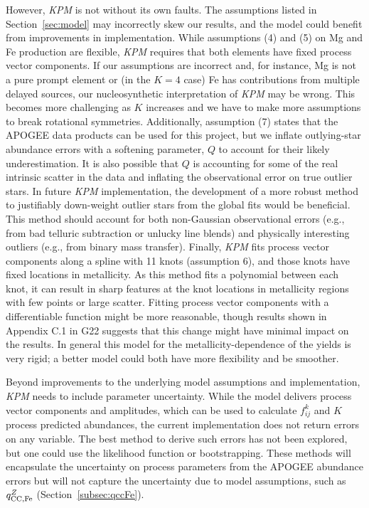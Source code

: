 \documentclass[modern]{aastex631}
\newcommand{\qccFe}{q_{{\rm CC, Fe}}^{Z}}
\newcommand{\name}{\textsl{KPM}}
\begin{document}
However, \name{} is not without its own faults. The assumptions listed in Section~\ref{sec:model} may incorrectly skew our results, and the model could benefit from improvements in implementation. While assumptions (4) and (5) on Mg and Fe production are flexible, \name{} requires that both elements have fixed process vector components. If our assumptions are incorrect and, for instance, Mg is not a pure prompt element or (in the $K=4$ case) Fe has contributions from multiple delayed sources, our nucleosynthetic interpretation of \name{} may be wrong. This becomes more challenging as $K$ increases and we have to make more assumptions to break rotational symmetries. Additionally, assumption (7) states that the APOGEE data products can be used for this project, but we inflate outlying-star abundance errors with a softening parameter, $Q$ to account for their likely underestimation. It is also possible that $Q$ is accounting for some of the real intrinsic scatter in the data and inflating the observational error on true outlier stars. In future \name{} implementation, the development of a more robust method to justifiably down-weight outlier stars from the global fits would be beneficial. This method should account for both non-Gaussian observational errors (e.g., from bad telluric subtraction or unlucky line blends) and physically interesting outliers (e.g., from binary mass transfer).
Finally, \name{} fits process vector components along a spline with 11 knots (assumption 6), and those knots have fixed locations in metallicity.
As this method fits a polynomial between each knot, it can result in sharp features at the knot locations in metallicity regions with few points or large scatter. Fitting process vector components with a differentiable function might be more reasonable, though results shown in Appendix C.1 in G22 suggests that this change might have minimal impact on the results. 
In general this model for the metallicity-dependence of the yields is very rigid; a better model could both have more flexibility and be smoother.

Beyond improvements to the underlying model assumptions and implementation, \name{} needs to include parameter uncertainty. While the model delivers process vector components and amplitudes, which can be used to calculate $f^{k}_{ij}$ and $K$ process predicted abundances, the current implementation does not return errors on any variable. The best method to derive such errors has not been explored, but one could use the likelihood function or bootstrapping. These methods will encapsulate the uncertainty on process parameters from the APOGEE abundance errors but will not capture the uncertainty due to model assumptions, such as $\qccFe$ (Section~\ref{subsec:qccFe}). 
\end{document}
